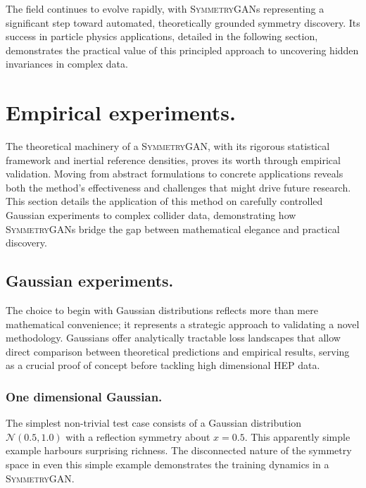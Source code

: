         The field continues to evolve rapidly, with \textsc{SymmetryGAN}s representing a significant step toward automated, theoretically grounded symmetry discovery.
        Its success in particle physics applications, detailed in the following section, demonstrates the practical value of this principled approach to uncovering hidden invariances in complex data.

\section{Empirical experiments.}
\label{sec:empirical-experiments}
\sectionminitoc
        The theoretical machinery of a \textsc{SymmetryGAN}, with its rigorous statistical framework and inertial reference densities, proves its worth through empirical validation.
        Moving from abstract formulations to concrete applications reveals both the method's effectiveness and challenges that might drive future research.
        This section details the application of this method on carefully controlled Gaussian experiments to complex collider data, demonstrating how \textsc{SymmetryGAN}s bridge the gap between mathematical elegance and practical discovery.

        \subsection{Gaussian experiments.}
            The choice to begin with Gaussian distributions reflects more than mere mathematical convenience; it represents a strategic approach to validating a novel methodology.
            Gaussians offer analytically tractable loss landscapes that allow direct comparison between theoretical predictions and empirical results, serving as a crucial proof of concept before tackling high dimensional HEP data.

            \subsubsection{One dimensional Gaussian.}
                The simplest non-trivial test case consists of a Gaussian distribution \(\mathcal{N}(0.5,1.0)\) with a reflection symmetry about \(x=0.5\).
                This apparently simple example harbours surprising richness.
                The disconnected nature of the symmetry space in even this simple example demonstrates the training dynamics in a \textsc{SymmetryGAN.}

